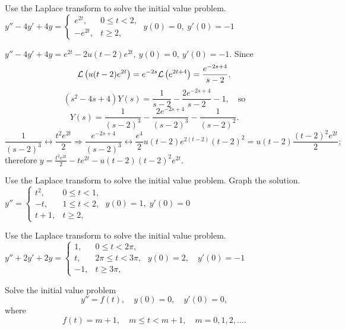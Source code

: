 \documentclass{ximera}
\begin{document}
\begin{problem}\label{exer:8.5.18} Use the Laplace transform to solve the initial value problem.
$y''-4y'+4y=\left\{\begin{array}{rl}
e^{2t},&0\le t<2,\\-e^{2t},&t\ge 2,\end{array}\right.\;  y(0)=0,\;
y'(0)=-1$

\begin{solution}
$y''-4y'+4y=e^{2t}-2u(t-2)e^{2t},\ y(0)=0,\ y'(0)=-1$.
Since
$$
{\cal L}\left(u(t-2)e^{2t}\right)=e^{-2s}{\cal
L}\left(e^{2t+4}\right)=\frac{e^{-2s+4}}{s-2},
$$
$$
(s^2-4s+4)Y(s)=\frac{1}{s-2}-\frac{2e^{-2s+4}}{s-2}-1,\quad\mbox{so}
$$
$$
Y(s)=\frac{1}{(s-2)^3}-\frac{2e^{-2s+4}}{(s-2)^3}-\frac{1}{(s-2)^2}.
$$
$$
\frac{1}{(s-2)^3}\leftrightarrow \frac{t^2e^{2t}}{2}\Rightarrow
\frac{e^{-2s+4}}{(s-2)^3}\leftrightarrow\frac{e^4}{2}u(t-2)e^{2(t-2)}(t-2)^2
=u(t-2)\frac{(t-2)^2e^{2t}}{2};
$$
therefore
$y=\frac{t^2e^{2t}}{2}-te^{2t}-u(t-2)(t-2)^2e^{2t}$.
\end{solution}
\end{problem}

\begin{problem}\label{exer:8.5.19} Use the Laplace transform to solve the initial value problem.  Graph the solution. 
$y''=\left\{\begin{array}{cl}t^2,&0\le
t<1,\\-t,&1\le t<2,\\t+1,&t\ge 2,\end{array}\right.\;  y(0)=1,\;
y'(0)=0$
\end{problem}

\begin{problem}\label{exer:8.5.20} Use the Laplace transform to solve the initial value problem.
$y''+2y'+2y=\left\{\begin{array}{rl}1,&0\le
t<2\pi,\\t,&2\pi\le t<3\pi,\\-1,&t\ge 3\pi,\end{array}\right.\;
y(0)=2,\quad y'(0)=-1$
\end{problem}

\begin{problem}\label{exer:8.5.21} Solve the initial value problem $$ y''=f(t), \quad
y(0)=0,\quad  y'(0)=0, $$ where $$ f(t)=m+1,\quad m\le t<m+1,\quad
m=0,1,2,\dots. $$
\end{problem}
\end{document}

